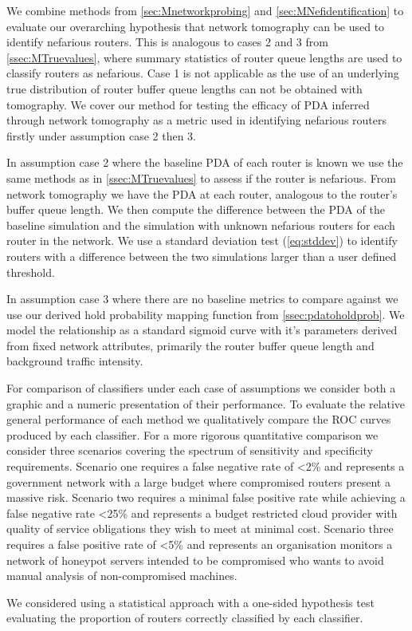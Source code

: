   We combine methods from \cref{sec:Mnetworkprobing} and \cref{sec:MNefidentification} to evaluate our overarching hypothesis that network tomography can be used to identify nefarious routers. This is analogous to cases 2 and 3 from \cref{ssec:MTruevalues}, where summary statistics of router queue lengths are used to classify routers as nefarious. Case 1 is not applicable as the use of an underlying true distribution of router buffer queue lengths can not be obtained with tomography. We cover our method for testing the efficacy of PDA inferred through network tomography as a metric used in identifying nefarious routers firstly under assumption case 2 then 3.\par
  In assumption case 2 where the baseline PDA of each router is known we use the same methods as in \cref{ssec:MTruevalues} to assess if the router is nefarious. From network tomography we have the PDA at each router, analogous to the router's buffer queue length. We then compute the difference between the PDA of the baseline simulation and the simulation with unknown nefarious routers for each router in the network. We use a standard deviation test (\cref{eq:stddev}) to identify routers with a difference between the two simulations larger than a user defined threshold.\par
  In assumption case 3 where there are no baseline metrics to compare against we use our derived hold probability mapping function from \cref{ssec:pdatoholdprob}. We model the relationship as a standard sigmoid curve with it's parameters derived from fixed network attributes, primarily the router buffer queue length and background traffic intensity.\par
  For comparison of classifiers under each case of assumptions we consider both a graphic and a numeric presentation of their performance. To evaluate the relative general performance of each method we qualitatively compare the ROC curves produced by each classifier. For a more rigorous quantitative comparison we consider three scenarios covering the spectrum of sensitivity and specificity requirements. Scenario one requires a false negative rate of <2\% and represents a government network with a large budget where compromised routers present a massive risk. Scenario two requires a minimal false positive rate while achieving a false negative rate <25\% and represents a budget restricted cloud provider with quality of service obligations they wish to meet at minimal cost. Scenario three requires a false positive rate of <5\% and represents an organisation monitors a network of honeypot servers intended to be compromised who wants to avoid manual analysis of non-compromised machines.\par
  We considered using a statistical approach with a one-sided hypothesis test evaluating the proportion of routers correctly classified by each classifier.  

